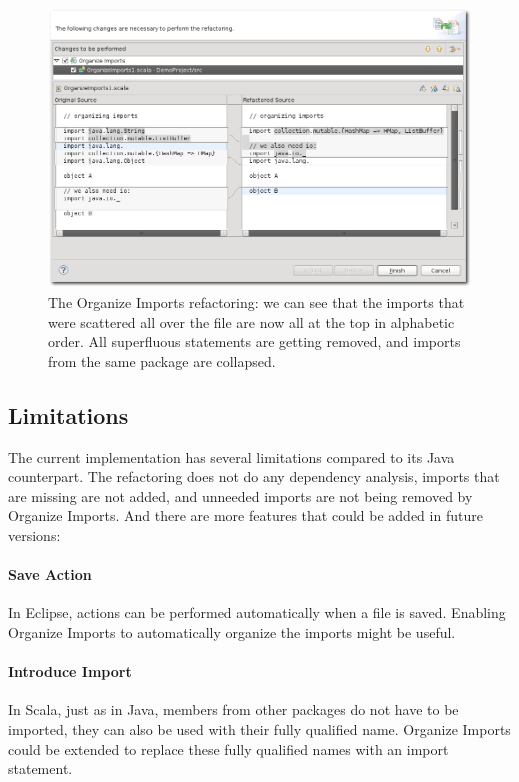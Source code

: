 \documentclass[10pt,a4paper,oneside]{scrreprt}
\begin{document}
\begin{figure}
  \centering
  \includegraphics[width=\linewidth]{organize_screenshot_1.png}
  \caption{The Organize Imports refactoring: we can see that the imports that were scattered all over the file are now all at the top in alphabetic order. All superfluous statements are getting removed, and imports from the same package are collapsed.}
  \label{figure:organize-screenshot-1}
\end{figure}

\subsection{Limitations}

The current implementation has several limitations compared to its Java counterpart. The refactoring does not do any dependency analysis, imports that are missing are not added, and unneeded imports are not being removed by Organize Imports. And there are more features that could be added in future versions:

\paragraph{Save Action} In Eclipse, actions can be performed automatically when a file is saved. Enabling Organize Imports to automatically organize the imports might be useful.

\paragraph{Introduce Import} In Scala, just as in Java, members from other packages do not have to be imported, they can also be used with their fully qualified name. Organize Imports could be extended to replace these fully qualified names with an import statement. 
\end{document}
